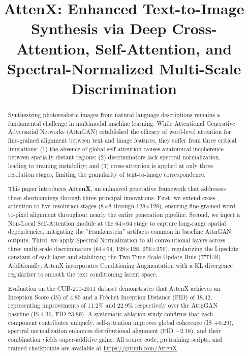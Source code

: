 \documentclass[conference]{IEEEtran}
\begin{document}
\title{AttenX: Enhanced Text-to-Image Synthesis via Deep Cross-Attention, Self-Attention, and Spectral-Normalized Multi-Scale Discrimination}

\maketitle

\begin{abstract}
Synthesizing photorealistic images from natural language descriptions remains a fundamental challenge in multimodal machine learning. While Attentional Generative Adversarial Networks (AttnGAN) established the efficacy of word-level attention for fine-grained alignment between text and image features, they suffer from three critical limitations: (1) the absence of global self-attention causes anatomical incoherence between spatially distant regions; (2) discriminators lack spectral normalization, leading to training instability; and (3) cross-attention is applied at only three resolution stages, limiting the granularity of text-to-image correspondence.

This paper introduces \textbf{AttenX}, an enhanced generative framework that addresses these shortcomings through three principal innovations. First, we extend cross-attention to five resolution stages (8$\times$8 through 128$\times$128), ensuring fine-grained word-to-pixel alignment throughout nearly the entire generation pipeline. Second, we inject a Non-Local Self-Attention module at the 64$\times$64 stage to capture long-range spatial dependencies, mitigating the ``Frankenstein'' artifacts common in baseline AttnGAN outputs. Third, we apply Spectral Normalization to all convolutional layers across three multi-scale discriminators (64$\times$64, 128$\times$128, 256$\times$256), regularizing the Lipschitz constant of each layer and stabilizing the Two Time-Scale Update Rule (TTUR). Additionally, AttenX incorporates Conditioning Augmentation with a KL divergence regularizer to smooth the text conditioning latent space.

Evaluation on the CUB-200-2011 dataset demonstrates that AttenX achieves an Inception Score (IS) of 4.85 and a Fr\'{e}chet Inception Distance (FID) of 18.42, representing improvements of 11.2\% and 22.9\% respectively over the AttnGAN baseline (IS 4.36, FID 23.89). A systematic ablation study confirms that each component contributes uniquely: self-attention improves global coherence (IS +0.29), spectral normalization enhances distributional alignment (FID $-$2.18), and their combination yields super-additive gains. All source code, pretraining scripts, and trained checkpoints are available at \url{https://github.com/AttenX}.
\end{abstract}
\end{document}
